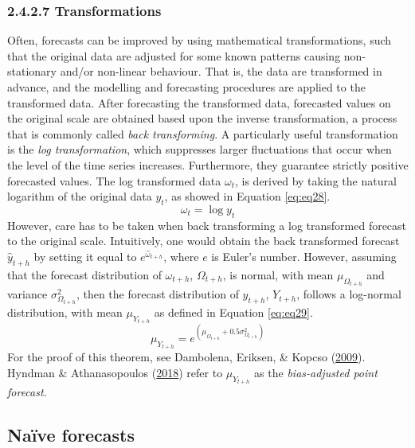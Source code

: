 \documentclass[12pt,oneside]{reedthesis}
\begin{document}
\subsubsection{2.4.2.7 Transformations}\label{twofourtwoseven}

Often, forecasts can be improved by using mathematical transformations,
such that the original data are adjusted for some known patterns causing
non-stationary and/or non-linear behaviour. That is, the data are
transformed in advance, and the modelling and forecasting procedures are
applied to the transformed data. After forecasting the transformed data,
forecasted values on the original scale are obtained based upon the
inverse transformation, a process that is commonly called \emph{back
transforming}. A particularly useful transformation is the \emph{log
transformation}, which suppresses larger fluctuations that occur when
the level of the time series increases. Furthermore, they guarantee
strictly positive forecasted values. The log transformed data
\(\omega_{t}\), is derived by taking the natural logarithm of the
original data \(y_{t}\), as showed in Equation \eqref{eq:eq28}.
\begin{equation}
\omega_{t} = \log y_{t}
\label{eq:eq28}
\end{equation}
However, care has to be taken when back transforming a log transformed
forecast to the original scale. Intuitively, one would obtain the back
transformed forecast \(\hat{y}_{t+h}\) by setting it equal to
\(e^{\hat{\omega}_{t+h}}\), where \(e\) is Euler's number. However,
assuming that the forecast distribution of \(\omega_{t+h}\),
\(\Omega_{t+h}\), is normal, with mean \(\mu_{\Omega_{t+h}}\) and
variance \(\sigma_{\Omega_{t+h}}^{2}\), then the forecast distribution
of \(y_{t+h}\), \(Y_{t+h}\), follows a log-normal distribution, with
mean \(\mu_{Y_{t+h}}\) as defined in Equation \eqref{eq:eq29}.
\begin{equation}
\mu_{Y_{t+h}} = e^{(\mu_{\Omega_{t+h}} + 0.5 \sigma_{\Omega_{t+h}}^{2})}
\label{eq:eq29}
\end{equation}
For the proof of this theorem, see Dambolena, Eriksen, \& Kopcso
(\protect\hyperlink{ref-dambolena2009}{2009}). Hyndman \& Athanasopoulos
(\protect\hyperlink{ref-hyndman2018fpp}{2018}) refer to
\(\mu_{Y_{t+h}}\) as the \emph{bias-adjusted point forecast}.

\subsection{Naïve forecasts}\label{twofourthree}
\end{document}
